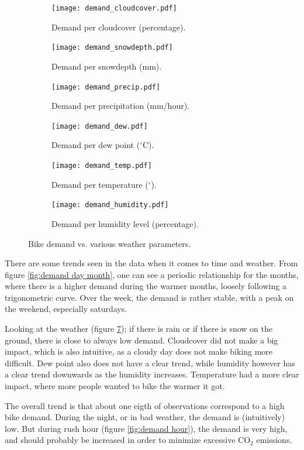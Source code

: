\begin{figure}[htbp]
    \centering

    \begin{subfigure}{0.30\textwidth}
        \centering
        \texttt{[image: demand\_cloudcover.pdf]}
        \caption{Demand per cloudcover (percentage).}
        \label{fig:demand cloudcover}
    \end{subfigure}
    \hfill
    \begin{subfigure}{0.30\textwidth}
        \centering
        \texttt{[image: demand\_snowdepth.pdf]}
        \caption{Demand per snowdepth (mm).}
        \label{fig:demand snowdepth}
    \end{subfigure}
    \hfill
    \begin{subfigure}{0.30\textwidth}
        \centering
        \texttt{[image: demand\_precip.pdf]}
        \caption{Demand per precipitation (mm/hour).}
        \label{fig:demand precip}
    \end{subfigure}
    \begin{subfigure}{0.30\textwidth}
        \centering
        \texttt{[image: demand\_dew.pdf]}
        \caption{Demand per dew point ($^\circ$C).}
        \label{fig:demand dew}
    \end{subfigure}
    \begin{subfigure}{0.30\textwidth}
        \centering
        \texttt{[image: demand\_temp.pdf]}
        \caption{Demand per temperature ($^\circ$).}
        \label{fig:demand temp}
    \end{subfigure}
    \begin{subfigure}{0.30\textwidth}
        \centering
        \texttt{[image: demand\_humidity.pdf]}
        \caption{Demand per humidity level (percentage).} 
        \label{fig:demand humidity}
    \end{subfigure}
        \caption{Bike demand vs. various weather parameters.}
        \label{fig:demand weather}
\end{figure}
There are some trends seen in the data when it comes to time and weather. From figure \ref{fig:demand day month}, one can see a periodic relationship for the months, where there is a higher demand during the warmer months, loosely following a trigonometric curve. Over the week, the demand is rather stable, with a peak on the weekend, especially saturdays. 

Looking at the weather (figure \ref{fig:demand weather}); if there is rain or if there is snow on the ground, there is close to always low demand. Cloudcover did not make a big impact, which is also intuitive, as a cloudy day does not make biking more difficult. Dew point also does not have a clear trend, while humidity however has a clear trend downwards as the humidity increases. Temperature had a more clear impact, where more people wanted to bike the warmer it got.

The overall trend is that about one eigth of observations correspond to a high bike demand. During the night, or in bad weather, the demand is (intuitively) low. But during rush hour (figure \ref{fig:demand hour}), the demand is very high, and should probably be increased in order to minimize excessive CO$_2$ emissions.